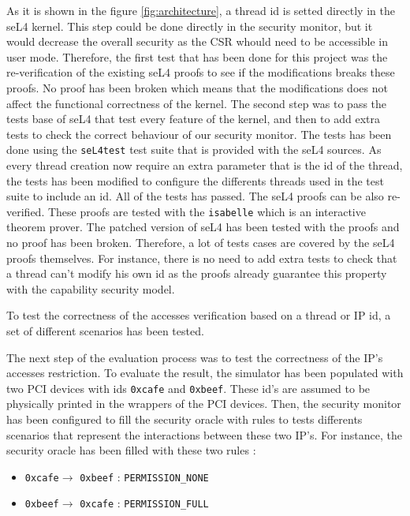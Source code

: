 \documentclass[conference]{IEEEtran}
\begin{document}
As it is shown in the figure \ref{fig:architecture}, a thread id is setted directly in the seL4 kernel. This step could be done directly in the security monitor, but it would decrease the overall security as the CSR whould need to be accessible in user mode. Therefore, the first test that has been done for this project was the re-verification of the existing seL4 proofs to see if the modifications breaks these proofs. No proof has been broken which means that the modifications does not affect the functional correctness of the kernel. 
The second step was to pass the tests base of seL4 that test every feature of the kernel, and then to add extra tests to check the correct behaviour of our security monitor. The tests has been done using the \texttt{seL4test} test suite that is provided with the seL4 sources. As every thread creation now require an extra parameter that is the id of the thread, the tests has been modified to configure the differents threads used in the test suite to include an id. All of the tests has passed. The seL4 proofs can be also re-verified. These proofs are tested with the \texttt{isabelle} which is an interactive theorem prover. The patched version of seL4 has been tested with the proofs and no proof has been broken. Therefore, a lot of tests cases are covered by the seL4 proofs themselves. For instance, there is no need to add extra tests to check that a thread can't modify his own id as the proofs already guarantee this property with the capability security model.

To test the correctness of the accesses verification based on a thread or IP id, a set of different scenarios has been tested. 

The next step of the evaluation process was to test the correctness of the IP's accesses restriction. To evaluate the result, the simulator has been populated with two PCI devices with ids \texttt{0xcafe} and \texttt{0xbeef}. These id's are assumed to be physically printed in the wrappers of the PCI devices. Then, the security monitor has been configured to fill the security oracle with rules to tests differents scenarios that represent the interactions between these two IP's. For instance, the security oracle has been filled with these two rules :

\begin{itemize}
    \item \texttt{0xcafe}$\rightarrow$ \texttt{0xbeef} : \texttt{PERMISSION\_NONE}
    \item \texttt{0xbeef}$\rightarrow$ \texttt{0xcafe} : \texttt{PERMISSION\_FULL}
\end{itemize}
\end{document}
